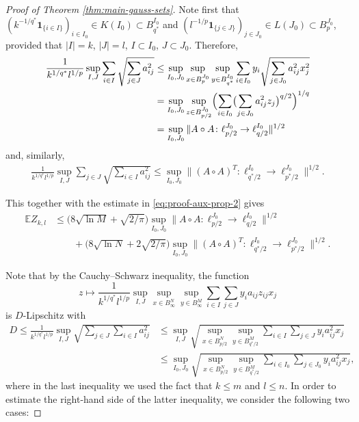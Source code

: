 \documentclass[a4paper]{amsart}
\theoremstyle{definition}
\theoremstyle{remark}
\numberwithin{equation}{section}
\newcommand*{\EE}{\mathbb{E}}
\newcommand*{\hadprod}{\mathbin{\circ}} %
\newcommand*{\ind}{\mathbf{1}} %
\begin{document}
\begin{proof}[Proof of Theorem \ref{thm:main-gauss-sets}]
	Note first that $(k^{-1/q^\ast} \ind_{\{i\in I\}})_{i\in I_0}\in K(I_0)\subset B_{q^\ast}^{I_0}$
		and $(l^{-1/p} \ind_{\{j\in J\}})_{j\in J_0}\in L(J_0)\subset B_{p}^{J_0}$, provided that $|I|=k$, $|J|=l$, $I\subset I_0$, $J\subset J_0$.
	Therefore, 
	\begin{align*}
		  \frac 1{k^{1/q^*}l^{1/p}}	\sup_{I, J}  \sum_{i\in I}  \sqrt{\sum_{j\in J} a_{ij}^2}
		  & \leq \sup_{I_0, J_0} \sup_{x\in B_{p}^{J_0}} \sup_{y\in B_{q^\ast}^{I_0}}   \sum_{i\in I_0}  y_i\sqrt{\sum_{j\in J_0} a_{ij}^2x_j^2}	\\
		  & =  \sup_{I_0, J_0} \sup_{z\in B_{p/2}^{J_0}} \Bigl(\sum_{i\in I_0}  \bigl( \sum_{j\in J_0} a_{ij}^2z_j\bigr)^{q/2}\Bigr)^{1/q}
		\\ & =  \sup_{I_0, J_0} \|A\hadprod A \colon \ell^{J_0}_{p/2} \to \ell^{I_0}_{q/2}\|^{1/2}
	\end{align*}
	and, similarly,
	\begin{align*}
		  \frac 1{k^{1/q^*}l^{1/p}}	\sup_{I, J}   \sum_{j\in J} \sqrt{\sum_{i\in I} a_{ij}^2 }
		   \le \sup_{I_0, J_0}  \|(A\hadprod A)^T \colon \ell^{I_0}_{q^*/2} \to \ell^{J_0}_{p^*/2}\|^{1/2}.
	\end{align*}
	
	This together with the estimate in \eqref{eq:proof-aux-prop-2} gives
	\begin{align}  \label{eq:proof-aux-prop-3}
		\EE Z_{k,l}  &\leq
\bigl(8\sqrt{\ln M}   + \sqrt{2/\pi}\bigr)\sup_{I_0, J_0} \|A\hadprod A \colon \ell^{J_0}_{p/2} \to \ell^{I_0}_{q/2}\|^{1/2}
\nonumber\\
 &   \qquad + \bigl(8\sqrt{\ln N} +2 \sqrt{2/\pi}\bigr)  \sup_{I_0, J_0}  \|(A\hadprod A)^T \colon \ell^{I_0}_{q^*/2} \to \ell^{J_0}_{p^*/2}\|^{1/2} .
	\end{align}
		
	Note that by the Cauchy--Schwarz inequality, the function
	\[
		z\mapsto  \frac 1{k^{1/q^*}l^{1/p}} \sup_{I,J} \sup_{x\in B_\infty^N} \sup_{y\in B_\infty^M} \sum_{i\in I}\sum_{j\in J} y_ia_{ij}z_{ij}x_j
	\]
	is $D$-Lipschitz with
		  \begin{align*}
	 D\le \frac 1{k^{1/q^*}l^{1/p}} \sup_{I, J} \sqrt{  \sum_{j\in J} \sum_{i\in I} a_{ij}^2 }  &\le \sup_{I, J} \sqrt{ \sup_{x\in B_{p/2}^N}\sup_{y\in B_{q^*/2}^M} \sum_{i\in I}\sum_{j\in J} y_i a_{ij}^2 x_j}
	 \\ 
		 & \le \sup_{I_0, J_0} \sqrt{ \sup_{x\in B_{p/2}^N}\sup_{y\in B_{q^*/2}^M} \sum_{i\in I_0}\sum_{j\in J_0} y_i a_{ij}^2 x_j},
	 \end{align*}
	 where in the last inequality we used the fact that $k\le m$ and $l\le n$.
	  In order to estimate the right-hand side of the latter inequality, we consider the following two cases:
	

\end{proof}
\end{document}
